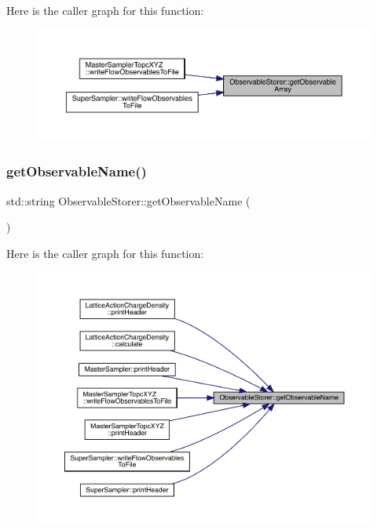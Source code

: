 Here is the caller graph for this function\+:\nopagebreak
\begin{figure}[H]
\begin{center}
\leavevmode
\includegraphics[width=350pt]{class_observable_storer_ab8885ce7eb3baa3fdb39cda767be6c83_icgraph}
\end{center}
\end{figure}
\mbox{\label{class_observable_storer_aa04dd06fe053670f4c8f027aa744277a}} 
\subsubsection{\texorpdfstring{getObservableName()}{getObservableName()}}
{\footnotesize\ttfamily std\+::string Observable\+Storer\+::get\+Observable\+Name (\begin{DoxyParamCaption}{ }\end{DoxyParamCaption})\hspace{0.3cm}{\ttfamily [inline]}}

Here is the caller graph for this function\+:\nopagebreak
\begin{figure}[H]
\begin{center}
\leavevmode
\includegraphics[width=350pt]{class_observable_storer_aa04dd06fe053670f4c8f027aa744277a_icgraph}
\end{center}
\end{figure}
\mbox{\label{class_observable_storer_a1eae8d9c9b4f9c60facc21a26b3bbb26}} 
